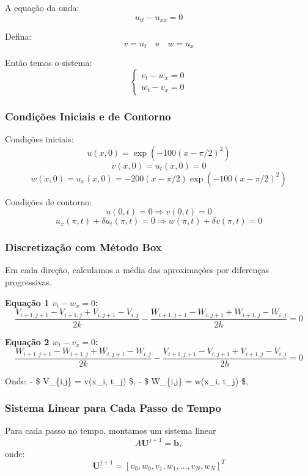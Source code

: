 \documentclass[11pt]{article}
\begin{document}
A equação da onda: \[ u_{tt} - u_{xx} = 0 \]

Defina: \[ v = u_t \quad \text{e} \quad w = u_x \]

Então temos o sistema: \[ \begin{cases}
v_t - w_x = 0 \\
w_t - v_x = 0
\end{cases} \]

\hypertarget{condiuxe7uxf5es-iniciais-e-de-contorno}{%
\subsubsection{Condições Iniciais e de
Contorno}\label{condiuxe7uxf5es-iniciais-e-de-contorno}}

Condições iniciais: \[ u(x,0) = \exp(-100(x-\pi/2)^2) \]
\[ v(x,0) = u_t(x,0) = 0 \]
\[ w(x,0) = u_x(x,0) = -200(x-\pi/2)\exp(-100(x-\pi/2)^2) \]

Condições de contorno: \[ u(0,t) = 0 \Rightarrow v(0,t) = 0 \]
\[ u_x(\pi,t) + \delta u_t(\pi,t) = 0 \Rightarrow w(\pi,t) + \delta v(\pi,t) = 0 \]

\hypertarget{discretizauxe7uxe3o-com-muxe9todo-box}{%
\subsubsection{Discretização com Método
Box}\label{discretizauxe7uxe3o-com-muxe9todo-box}}

Em cada direção, calculamos a média das aproximações por diferenças
progressivas.

\textbf{Equação 1 \(v_t - w_x = 0\):}
\[ \frac{V_{i+1,j+1} - V_{i+1,j}+ V_{i,j+1} - V_{i,j}}{2k} - \frac{W_{i+1,j+1} - W_{i,j+1} + W_{i+1,j} - W_{i,j}}{2h} = 0 \]

\textbf{Equação 2 \(w_t - v_x = 0\):}
\[ \frac{W_{i+1,j+1} - W_{i+1,j} + W_{i,j+1} - W_{i,j}}{2k} - \frac{V_{i+1,j+1} - V_{i,j+1} + V_{i+1,j} - V_{i,j}}{2h} = 0 \]

Onde: - \$ V\_\{i,j\} = v(x\_i, t\_j) \$, - \$ W\_\{i,j\} = w(x\_i,
t\_j) \$,

\hypertarget{sistema-linear-para-cada-passo-de-tempo}{%
\subsubsection{Sistema Linear para Cada Passo de
Tempo}\label{sistema-linear-para-cada-passo-de-tempo}}

Para cada passo no tempo, montamos um sistema linear
\[A\mathbf{U}^{j+1} = \mathbf{b},\] onde:
\[ \mathbf{U}^{j+1} = [v_0, w_0, v_1, w_1, \ldots, v_N, w_N]^T \]
\end{document}
